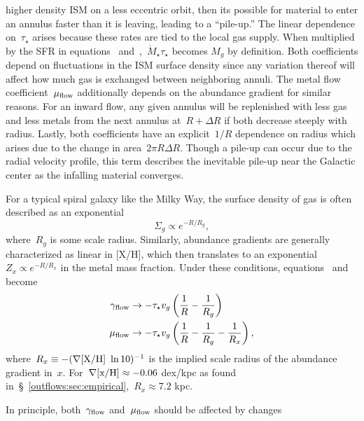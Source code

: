 higher density ISM on a less eccentric orbit, then its possible for material to
enter an annulus faster than it is leaving, leading to a ``pile-up.''
The linear dependence on~$\tau_\star$ arises because these rates are tied to
the local gas supply.
When multiplied by the SFR in equations~
and~,~$\dot{M}_\star \tau_\star$ becomes
$M_g$ by definition.
Both coefficients depend on fluctuations in the ISM surface density since any
variation thereof will affect how much gas is exchanged between neighboring
annuli.
The metal flow coefficient~$\mu_{\text{flow}}$ additionally depends on the abundance
gradient for similar reasons.
For an inward flow, any given annulus will be replenished with less gas and
less metals from the next annulus at~$R + \Delta R$ if both decrease steeply
with radius.
Lastly, both coefficients have an explicit~$1 / R$ dependence on radius which
arises due to the change in area~$2 \pi R \Delta R$.
Though a pile-up can occur due to the radial velocity profile, this term
describes the inevitable pile-up near the Galactic center as the infalling
material converges.
\par
For a typical spiral galaxy like the Milky Way, the surface density of gas is
often described as an exponential
\begin{equation}
\Sigma_g \propto e^{-R / R_g},
\end{equation}
where~$R_g$ is some scale radius.
Similarly, abundance gradients are generally characterized as linear in [X/H],
which then translates to an exponential~$Z_x \propto e^{-R / R_x}$ in the
metal mass fraction.
Under these conditions, equations~
and~ become
\begin{subequations}\begin{align}
\gamma_{\text{flow}} &\rightarrow -\tau_\star v_g
\left(\frac{1}{R} - \frac{1}{R_g}\right)
\label{outflows:eq:gamma-flow}
\\
\mu_{\text{flow}} &\rightarrow -\tau_\star v_g
\left(\frac{1}{R} - \frac{1}{R_g} - \frac{1}{R_x}\right),
\label{outflows:eq:mu-flow}
\end{align}\end{subequations}
where~$R_x \equiv -(\nabla\text{[X/H]}~\ln 10)^{-1}$ is the implied scale radius of the
abundance gradient in~$x$.
For~$\nabla\text{[x/H]} \approx -0.06$ dex/kpc as found
in~\S~\ref{outflows:sec:empirical},~$R_x \approx 7.2$ kpc.
\par
In principle, both~$\gamma_{\text{flow}}$ and~$\mu_{\text{flow}}$ should be affected by changes

